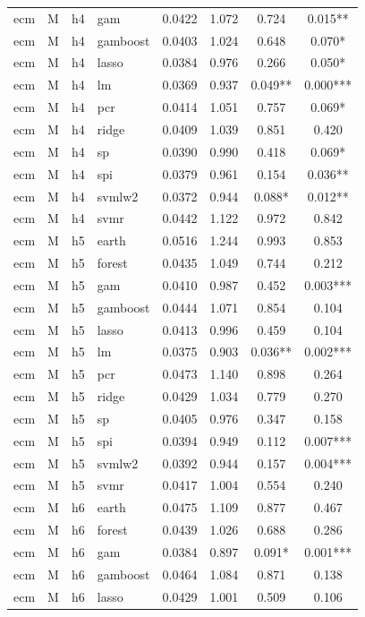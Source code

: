 \begin{ThreePartTable}
\begin{longtable}[t]{llclcccc}
ecm & M & h4 & gam & 0.0422 & 1.072 & 0.724 & 0.015**\\
ecm & M & h4 & gamboost & 0.0403 & 1.024 & 0.648 & 0.070*\\
ecm & M & h4 & lasso & 0.0384 & 0.976 & 0.266 & 0.050*\\
ecm & M & h4 & lm & 0.0369 & 0.937 & 0.049** & 0.000***\\
ecm & M & h4 & pcr & 0.0414 & 1.051 & 0.757 & 0.069*\\
ecm & M & h4 & ridge & 0.0409 & 1.039 & 0.851 & 0.420\\
ecm & M & h4 & sp & 0.0390 & 0.990 & 0.418 & 0.069*\\
ecm & M & h4 & spi & 0.0379 & 0.961 & 0.154 & 0.036**\\
ecm & M & h4 & svmlw2 & 0.0372 & 0.944 & 0.088* & 0.012**\\
ecm & M & h4 & svmr & 0.0442 & 1.122 & 0.972 & 0.842\\
\addlinespace
ecm & M & h5 & earth & 0.0516 & 1.244 & 0.993 & 0.853\\
ecm & M & h5 & forest & 0.0435 & 1.049 & 0.744 & 0.212\\
ecm & M & h5 & gam & 0.0410 & 0.987 & 0.452 & 0.003***\\
ecm & M & h5 & gamboost & 0.0444 & 1.071 & 0.854 & 0.104\\
ecm & M & h5 & lasso & 0.0413 & 0.996 & 0.459 & 0.104\\
ecm & M & h5 & lm & 0.0375 & 0.903 & 0.036** & 0.002***\\
ecm & M & h5 & pcr & 0.0473 & 1.140 & 0.898 & 0.264\\
ecm & M & h5 & ridge & 0.0429 & 1.034 & 0.779 & 0.270\\
ecm & M & h5 & sp & 0.0405 & 0.976 & 0.347 & 0.158\\
ecm & M & h5 & spi & 0.0394 & 0.949 & 0.112 & 0.007***\\
ecm & M & h5 & svmlw2 & 0.0392 & 0.944 & 0.157 & 0.004***\\
ecm & M & h5 & svmr & 0.0417 & 1.004 & 0.554 & 0.240\\
\addlinespace
ecm & M & h6 & earth & 0.0475 & 1.109 & 0.877 & 0.467\\
ecm & M & h6 & forest & 0.0439 & 1.026 & 0.688 & 0.286\\
ecm & M & h6 & gam & 0.0384 & 0.897 & 0.091* & 0.001***\\
ecm & M & h6 & gamboost & 0.0464 & 1.084 & 0.871 & 0.138\\
ecm & M & h6 & lasso & 0.0429 & 1.001 & 0.509 & 0.106\\

\end{longtable}
\end{ThreePartTable}
